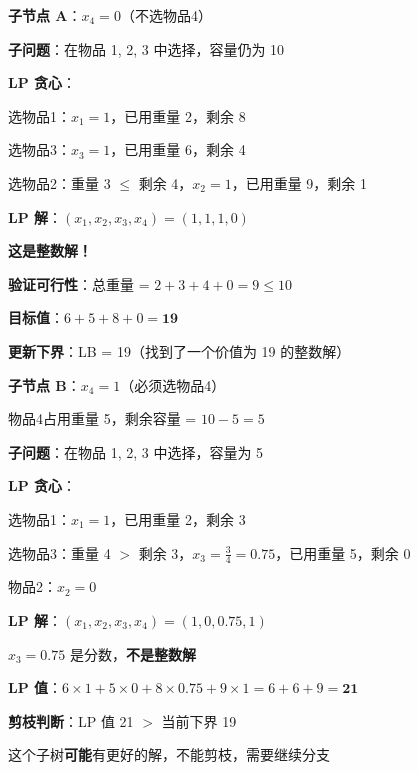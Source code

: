 \documentclass[12pt, a4paper]{ctexart}
\begin{document}
\begin{blackboard}

\textbf{子节点 A}：$x_4 = 0$（不选物品4）

\textbf{子问题}：在物品 1, 2, 3 中选择，容量仍为 10

\textbf{LP 贪心}：

选物品1：$x_1 = 1$，已用重量 2，剩余 8

选物品3：$x_3 = 1$，已用重量 6，剩余 4

选物品2：重量 3 $\leq$ 剩余 4，$x_2 = 1$，已用重量 9，剩余 1

\textbf{LP 解}：$(x_1, x_2, x_3, x_4) = (1, 1, 1, 0)$

\textbf{这是整数解！}

\textbf{验证可行性}：总重量 = $2 + 3 + 4 + 0 = 9 \leq 10$ \checkmark

\textbf{目标值}：$6 + 5 + 8 + 0 = \mathbf{19}$

\textbf{更新下界}：LB = 19（找到了一个价值为 19 的整数解）

\end{blackboard}

\begin{blackboard}

\textbf{子节点 B}：$x_4 = 1$（必须选物品4）

物品4占用重量 5，剩余容量 = $10 - 5 = 5$

\textbf{子问题}：在物品 1, 2, 3 中选择，容量为 5

\textbf{LP 贪心}：

选物品1：$x_1 = 1$，已用重量 2，剩余 3

选物品3：重量 4 $>$ 剩余 3，$x_3 = \frac{3}{4} = 0.75$，已用重量 5，剩余 0

物品2：$x_2 = 0$

\textbf{LP 解}：$(x_1, x_2, x_3, x_4) = (1, 0, 0.75, 1)$

$x_3 = 0.75$ 是分数，\textbf{不是整数解}

\textbf{LP 值}：$6 \times 1 + 5 \times 0 + 8 \times 0.75 + 9 \times 1 = 6 + 6 + 9 = \mathbf{21}$

\textbf{剪枝判断}：LP 值 21 $>$ 当前下界 19

这个子树\textbf{可能}有更好的解，不能剪枝，需要继续分支

\end{blackboard}
\end{document}
